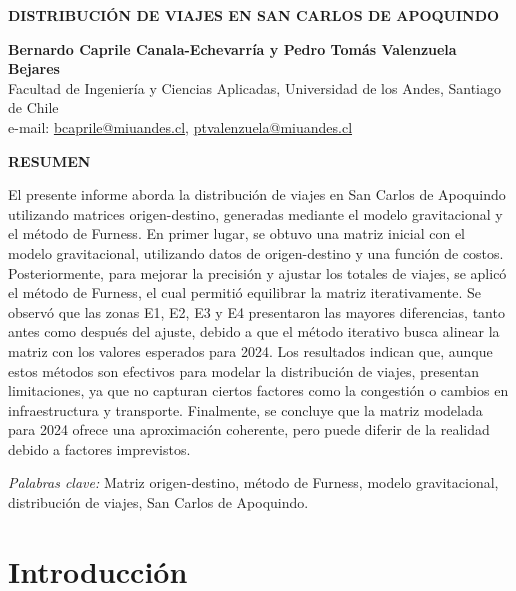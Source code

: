 \documentclass[letterpaper,12pt]{article}
\begin{document}
\begin{titlepage}
    \begin{center}
      \vspace*{1cm}

    \textbf{\Large DISTRIBUCIÓN DE VIAJES EN SAN CARLOS DE APOQUINDO}
    
    \vspace{1cm}
    
    \textbf{Bernardo Caprile Canala-Echevarría y Pedro Tomás Valenzuela Bejares}\\
    Facultad de Ingeniería y Ciencias Aplicadas, Universidad de los Andes, Santiago de Chile\\
    e-mail: \href{mailto:bcaprile@miuandes.cl}{bcaprile@miuandes.cl}, \href{mailto: ptvalenzuela@miuandes.cl}{ptvalenzuela@miuandes.cl}
    
    \vspace{2cm}
    
    \textbf{RESUMEN}
    
     
    \end{center}
    El presente informe aborda la distribución de viajes en San Carlos de Apoquindo utilizando matrices origen-destino, generadas mediante el modelo gravitacional y el método de Furness. En primer lugar, se obtuvo una matriz inicial con el modelo gravitacional, utilizando datos de origen-destino y una función de costos. Posteriormente, para mejorar la precisión y ajustar los totales de viajes, se aplicó el método de Furness, el cual permitió equilibrar la matriz iterativamente. Se observó que las zonas E1, E2, E3 y E4 presentaron las mayores diferencias, tanto antes como después del ajuste, debido a que el método iterativo busca alinear la matriz con los valores esperados para 2024. Los resultados indican que, aunque estos métodos son efectivos para modelar la distribución de viajes, presentan limitaciones, ya que no capturan ciertos factores como la congestión o cambios en infraestructura y transporte. Finalmente, se concluye que la matriz modelada para 2024 ofrece una aproximación coherente, pero puede diferir de la realidad debido a factores imprevistos.

    \vspace{0.5cm} 
    \textit{Palabras clave:} Matriz origen-destino, método de Furness, modelo gravitacional, distribución de viajes, San Carlos de Apoquindo.
\end{titlepage}

\newpage

\section{Introducción}
\end{document}
